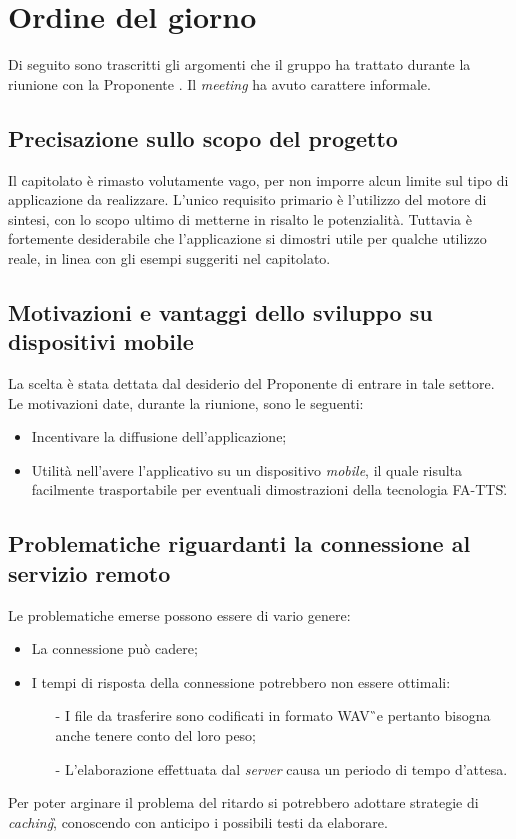 \section{Ordine del giorno}
Di seguito sono trascritti gli argomenti che il gruppo ha trattato durante la 
riunione con la Proponente \AZIENDA. Il \textit{meeting} ha avuto carattere 
informale.

\subsection{Precisazione sullo scopo del progetto}
Il capitolato è rimasto volutamente vago, per non imporre alcun limite sul tipo 
di applicazione da realizzare. L'unico requisito primario è l'utilizzo del 
motore di sintesi, con lo scopo ultimo di metterne in risalto le potenzialità. 
Tuttavia è fortemente desiderabile che l'applicazione si dimostri utile per 
qualche utilizzo reale, in linea con gli esempi suggeriti nel capitolato.

\subsection{Motivazioni e vantaggi dello sviluppo su dispositivi mobile}
La scelta è stata dettata dal desiderio del Proponente di entrare in tale 
settore. Le motivazioni date, durante la riunione, sono le seguenti:
\begin{itemize}
	\item Incentivare la diffusione dell'applicazione;
	\item Utilità nell'avere l'applicativo su un dispositivo \textit{mobile}, 
	il quale risulta facilmente trasportabile per eventuali dimostrazioni della 
	tecnologia FA-TTS\G.
\end{itemize}

\subsection{Problematiche riguardanti la connessione al servizio remoto}
Le problematiche emerse possono essere di vario genere:
\begin{itemize}
\item La connessione può cadere;
\item I tempi di risposta della connessione potrebbero non essere ottimali:
\begin{itemize}
\item[-]I file da trasferire sono codificati in formato WAV\G\ e pertanto 
bisogna anche tenere conto del loro peso;
\item[-]L'elaborazione effettuata dal \textit{server} causa un periodo di tempo 
d'attesa.
\end{itemize}
\end{itemize}
Per poter arginare il problema del ritardo si potrebbero adottare strategie di 
\textit{caching}\G , conoscendo con anticipo i possibili testi da elaborare.


